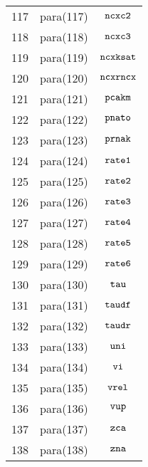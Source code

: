 \documentclass{article}
\begin{document}
\begin{center}
\begin{tabular}{|c|c|c|}
117 & para(117)  & $\mbox{\tt ncxc2}$ \\ 
118 & para(118)  & $\mbox{\tt ncxc3}$ \\ 
119 & para(119)  & $\mbox{\tt ncxksat}$ \\ 
120 & para(120)  & $\mbox{\tt ncxrncx}$ \\ 
121 & para(121)  & $\mbox{\tt pcakm}$ \\ 
122 & para(122)  & $\mbox{\tt pnato}$ \\ 
123 & para(123)  & $\mbox{\tt prnak}$ \\ 
124 & para(124)  & $\mbox{\tt rate1}$ \\ 
125 & para(125)  & $\mbox{\tt rate2}$ \\ 
126 & para(126)  & $\mbox{\tt rate3}$ \\ 
127 & para(127)  & $\mbox{\tt rate4}$ \\ 
128 & para(128)  & $\mbox{\tt rate5}$ \\ 
129 & para(129)  & $\mbox{\tt rate6}$ \\ 
130 & para(130)  & $\mbox{\tt tau}$ \\ 
131 & para(131)  & $\mbox{\tt taudf}$ \\ 
132 & para(132)  & $\mbox{\tt taudr}$ \\ 
133 & para(133)  & $\mbox{\tt uni}$ \\ 
134 & para(134)  & $\mbox{\tt vi}$ \\ 
135 & para(135)  & $\mbox{\tt vrel}$ \\ 
136 & para(136)  & $\mbox{\tt vup}$ \\ 
137 & para(137)  & $\mbox{\tt zca}$ \\ 
138 & para(138)  & $\mbox{\tt zna}$ \\ 
\hline
\end{tabular}
\end{center}
\end{document}
